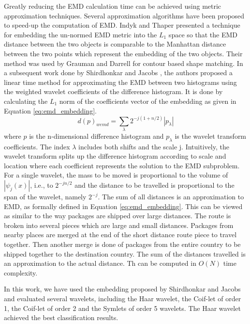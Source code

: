 \documentclass[10pt, conference, compsocconf]{IEEEtran}
\begin{document}
Greatly reducing the EMD calculation time can be achieved using metric approximation techniques.  
Several approximation algorithms have been proposed to speed-up the computation of EMD. 
Indyk and Thaper \cite{indyk2003fast} presented a technique for embedding the un-normed EMD metric into the $L_1$ space so that the EMD distance between the two objects is comparable to the Manhattan distance between the two points which represent the embedding of the two objects.
Their method was used by Grauman and Darrell \cite{grauman2004fast} for contour based shape matching.
In a subsequent work done by Shirdhonkar and Jacobs \cite{shirdhonkar2008approximate}, the authors proposed a linear time method for approximating the EMD between two histograms using the weighted wavelet coefficients of the difference histogram. 
It is done by calculating the $L_1$ norm of the coefficients vector of the embedding as given in Equation \ref{eq:emd_embedding}.
\begin{equation}
d(p)_{wemd}= \sum\limits_{\lambda} 2^{-j(1+n/2)}|p_{\lambda}|
\label{eq:emd_embedding}
\end{equation}
where $p$ is the n-dimensional difference histogram and $p_{\lambda}$ is the wavelet transform coefficients. 
The index $\lambda$ includes both shifts and the scale j.
Intuitively, the wavelet transform splits up the difference histogram according to scale and location where each coefficient represents the solution to the EMD subproblem. 
For a single wavelet, the mass to be moved is proportional to the volume of $|\psi_j(x)|$, i.e., to $2^{-jn/2}$ and the distance to be travelled is proportional to the span of the wavelet, namely $2^{-j}$. The sum of all distances is an approximation to EMD, as formally defined in Equation \ref{eq:emd_embedding}. 
This can be viewed as similar to the way packages are shipped over large distances. 
The route is broken into several pieces which are large and small distances. 
Packages from nearby places are merged at the end of the short distance route piece to travel together. 
Then another merge is done of packages from the entire country to be shipped together to the destination country. 
The sum of the distances travelled is an approximation to the actual distance.
Th can be computed in $O\left( N \right)$ time complexity.

In this work, we have used the embedding proposed by Shirdhonkar and Jacobs and evaluated several wavelets, including the Haar wavelet, the Coif-let of order 1, the Coif-let of order 2 and the Symlets of order 5 wavelets.
The Haar wavelet achieved the best classification results.
\end{document}
